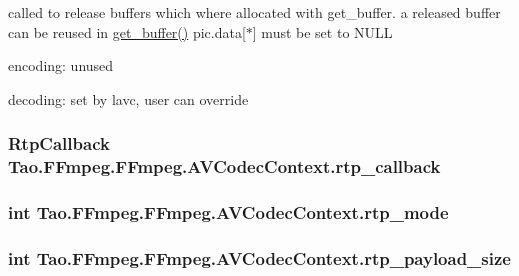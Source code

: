 \label{struct_tao_1_1_f_fmpeg_1_1_f_fmpeg_1_1_a_v_codec_context_adcd2bc41718cc8d7ecfb0cb369b34a6a}
called to release buffers which where allocated with get\_\-buffer. a released buffer can be reused in \hyperlink{struct_tao_1_1_f_fmpeg_1_1_f_fmpeg_1_1_a_v_codec_context_a48cbd8569687391bccaedb762db94404}{get\_\-buffer()} pic.data\mbox{[}$\ast$\mbox{]} must be set to NULL
\begin{DoxyItemize}
\item encoding: unused
\item decoding: set by lavc, user can override 
\end{DoxyItemize}\hypertarget{struct_tao_1_1_f_fmpeg_1_1_f_fmpeg_1_1_a_v_codec_context_a98298a1520e49251a1dba1935f29d066}{
\subsubsection[{rtp\_\-callback}]{\setlength{\rightskip}{0pt plus 5cm}RtpCallback {\bf Tao.FFmpeg.FFmpeg.AVCodecContext.rtp\_\-callback}}}
\label{struct_tao_1_1_f_fmpeg_1_1_f_fmpeg_1_1_a_v_codec_context_a98298a1520e49251a1dba1935f29d066}
\hypertarget{struct_tao_1_1_f_fmpeg_1_1_f_fmpeg_1_1_a_v_codec_context_a62fc742d578d920692a303883d7cafde}{
\subsubsection[{rtp\_\-mode}]{\setlength{\rightskip}{0pt plus 5cm}int {\bf Tao.FFmpeg.FFmpeg.AVCodecContext.rtp\_\-mode}}}
\label{struct_tao_1_1_f_fmpeg_1_1_f_fmpeg_1_1_a_v_codec_context_a62fc742d578d920692a303883d7cafde}
\hypertarget{struct_tao_1_1_f_fmpeg_1_1_f_fmpeg_1_1_a_v_codec_context_a0a266fb768f6b9d5753db5f96eb34579}{
\subsubsection[{rtp\_\-payload\_\-size}]{\setlength{\rightskip}{0pt plus 5cm}int {\bf Tao.FFmpeg.FFmpeg.AVCodecContext.rtp\_\-payload\_\-size}}}
